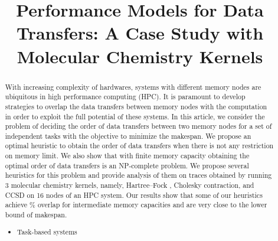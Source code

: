 \documentclass[runningheads]{llncs} %
\begin{document}
	\title{Performance Models for Data Transfers: A Case Study with Molecular Chemistry Kernels}
	\author{}
	\maketitle              %
	\begin{abstract} 

With increasing complexity of hardwares, systems with different memory nodes are ubiquitous in high performance computing (HPC). It is paramount to develop strategies to overlap the data transfers between memory nodes with the computation in order to exploit the full potential of these systems. In this article, we consider the problem of deciding the  order of data transfers between two memory nodes for a set of independent tasks  with the objective to minimize the makespan. We propose an optimal heuristic to obtain the order of data transfers when there is not any restriction on memory limit. We also show that with finite memory capacity obtaining the optimal order of data transfers is an NP-complete problem. We propose several heuristics for this problem and provide analysis of them on traces obtained by running 3 molecular chemistry kernels, namely, Hartree–Fock , Cholesky contraction, and CCSD on 16 nodes of an HPC system. Our results show that some of our heuristics achieve \% overlap for intermediate memory capacities and are very close to the lower bound of makespan.
		\begin{itemize}
			\item Task-based systems
		\end{itemize}
	\end{abstract} %
	
\end{document}
